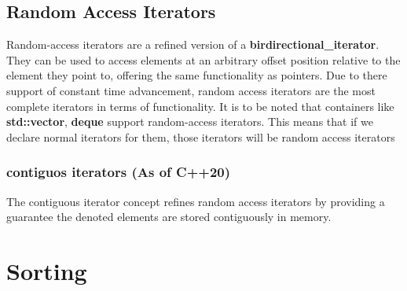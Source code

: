 \documentclass{report}
\begin{document}
\subsection*{Random Access Iterators}
Random-access iterators are  a refined version of a \textbf{birdirectional\_iterator}. They can be used to access elements at an arbitrary offset position relative to the element they point to, offering the same functionality as pointers. 
  \bigbreak \noindent
  Due to there support of constant time advancement, random access iterators are the most complete iterators in terms of functionality. 
  \bigbreak \noindent
  It is to be noted that containers like \textbf{std::vector}, \textbf{deque} support random-access iterators. This means that if we declare normal iterators for them, those iterators will be random access iterators
  \subsubsection*{contiguos iterators (As of C++20)}
  The contiguous iterator concept refines random access iterators by providing a guarantee the denoted elements are stored contiguously in memory.
  
  
\section{Sorting}
\end{document}
